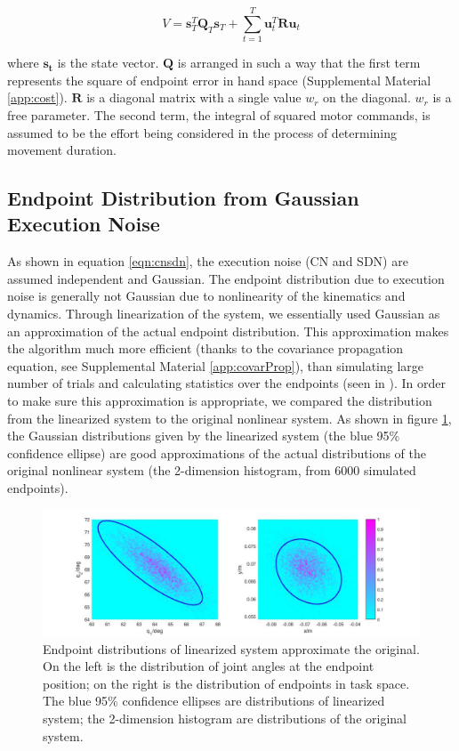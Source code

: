 \begin{equation}\label{eqn:cost}
V = \bm{s}_T^T\bm{Q}_T\bm{s}_T + \sum_{t=1}^T\bm{u}_t^T\bm{Ru}_t
\end{equation}

where $\bm{s_t}$ is the state vector. 
$\bm{Q}$ is arranged in such a way that the first term represents the square of endpoint error in hand space (Supplemental Material \ref{app:cost}). 
$\bm{R}$ is a diagonal matrix with a single value $w_r$ on the diagonal.
$w_r$ is a free parameter.
The second term, the integral of squared motor commands, is assumed to be the effort being considered in the process of determining movement duration. 

\subsection{Endpoint Distribution from Gaussian Execution Noise}

As shown in equation \ref{eqn:cnsdn}, the execution noise (CN and SDN) are assumed independent and Gaussian. 
The endpoint distribution due to execution noise is generally not Gaussian due to nonlinearity of the kinematics and dynamics. 
Through linearization of the system, we essentially used Gaussian as an approximation of the actual endpoint distribution. 
This approximation makes the algorithm much more efficient (thanks to the covariance propagation equation, see Supplemental Material \ref{app:covarProp}), than simulating large number of trials and calculating statistics over the endpoints (seen in \cite{VanBeers2004,Guigon2008}).
In order to make sure this approximation is appropriate, we compared the distribution from the linearized system to the original nonlinear system. As shown in figure \ref{fig:linearizeddistributionapprox}, the Gaussian distributions given by the linearized system (the blue 95\% confidence ellipse) are good approximations of the actual distributions of the original nonlinear system (the 2-dimension histogram, from 6000 simulated endpoints).

\begin{figure}
	\centering
	\includegraphics[width=\linewidth]{figures/linearizedDistributionApprox}
	\caption[Endpoint distributions of linearized system approximate the original]{Endpoint distributions of linearized system approximate the original. On the left is the distribution of joint angles at the endpoint position; on the right is the distribution of endpoints in task space. The blue 95\% confidence ellipses are distributions of linearized system; the 2-dimension histogram are distributions of the original system.}
	\label{fig:linearizeddistributionapprox}
\end{figure}

